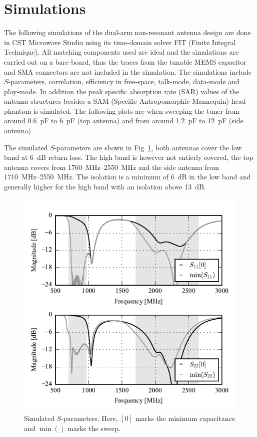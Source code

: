 \section{Simulations}
\label{sec:simulations}
The following simulations of the dual-arm non-resonant antenna design are done in CST Microwave Studio using its time-domain solver FIT (Finite Integral Technique). All matching components used are ideal and the simulations are carried out on a bare-board, thus the traces from the tunable MEMS capacitor and SMA connectors are not included in the simulation. The simulations include $S$-parameters, correlation, efficiency in free-space, talk-mode, data-mode and play-mode. In addition the peak specific absorption rate (SAR) values of the antenna structures besides a SAM (Specific Antropomorphic Mannequin) head phantom is simulated. The following plots are when sweeping the tuner from around \SI{0.6}{pF} to \SI{6}{pF} (top antenna) and from around \SI{1.2}{pF} to \SI{12}{pF} (side antenna)


The simulated $S$-parameters are shown in Fig~\ref{fig:sim_sparams}, both antennas cover the low band at \SI{6}{dB} return loss. The high band is however not entierly covered, the top antenna covers from \SIrange{1760}{2550}{MHz} and the side antenna from \SIrange{1710}{2550}{MHz}. The isolation is a minimum of \SI{6}{dB} in the low band and generally higher for the high band with an isolation above \SI{13}{dB}. 
\begin{figure}[tb]
    \centering
    \includegraphics{img/sim/sparams/sparams}
    \caption{Simulated $S$-parameters. Here, $[0]$ marks the minimum capacitance and $\min()$ marks the sweep.}
    \label{fig:sim_sparams}
\end{figure}


